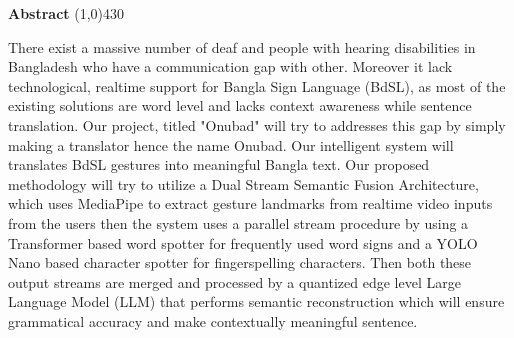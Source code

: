 \setlength{\headheight}{14pt}
\begin{center}
	{\huge \bf Abstract}
	\line(1,0){430}
\end{center}

There exist a massive number of deaf and people with hearing disabilities in Bangladesh who have a communication gap with other. Moreover it lack technological, realtime support for Bangla Sign Language (BdSL), as most of the existing solutions are word level and lacks context awareness while sentence translation. Our project, titled "Onubad" will try to  addresses this gap by simply making a translator hence the name Onubad. Our intelligent system will translates BdSL gestures into meaningful Bangla text. Our proposed methodology will try to utilize a Dual Stream Semantic Fusion Architecture\cite{study_dualstream_bilstm_2025}, which uses MediaPipe\cite{study_reliable_mediapipe_2024} to extract gesture landmarks from realtime video inputs from the users then the system uses a parallel stream procedure by using a Transformer based\cite{study_transformer_bdsl_2025} word spotter for frequently used word signs and a YOLO Nano \cite{yolo_nano_ref}based character spotter for fingerspelling characters. Then both these output streams are merged and processed by a quantized edge level Large Language Model (LLM) \cite{llm_reasoning_review}that performs semantic reconstruction which will ensure grammatical accuracy and make contextually meaningful sentence.
\clearpage
\setlength{\headheight}{12pt}